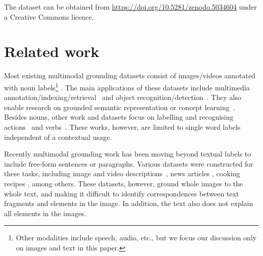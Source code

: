\documentclass[twocolumn]{svjour3}          \smartqed  \usepackage{graphicx}
\begin{document}
The dataset can be obtained from \url{https://doi.org/10.5281/zenodo.5034604} under a Creative Commons licence.

\section{Related work}
\label{sec:related}



Most existing multimodal grounding datasets consist of images/videos annotated with noun labels\footnote{Other modalities include speech, audio, etc., but we focus our discussion only on images and text in this paper.} \cite{DengEtAl:2009,LinEtAl:2014}. The main applications of these datasets include multimedia annotation/indexing/retrieval~\cite{SnoekWorring:2005} and object recognition/detection~\cite{LinEtAl:2014,RussakovskyEtAl:2015}. They also enable research on grounded semantic representation or concept learning~\cite{Baroni:2016,BeinbornEtAl:2018}. Besides nouns, other work and datasets focus on labelling and recognising actions~\cite{GellaKeller:2017} and verbs~\cite{GellaEtAl:2016}. These works, however, are limited to single word labels independent of a contextual usage. 

Recently multimodal grounding work has been moving beyond textual labels to include free-form sentences or paragraphs. Various datasets were constructed for these tasks, including image and video descriptions~\cite{BernardiEtAl:2016,AafaqEtAl:2018}, news articles \cite{FengLapata:2010,HollinkEtAl:2016,RamisaEtAl:2018}, cooking recipes \cite{MarinEtAl:2018}, among others. These datasets, however, ground whole images to the whole text, and making it difficult to identify correspondences between text fragments and elements in the image. In addition, the text also does not explain all elements in the images. 
\end{document}
